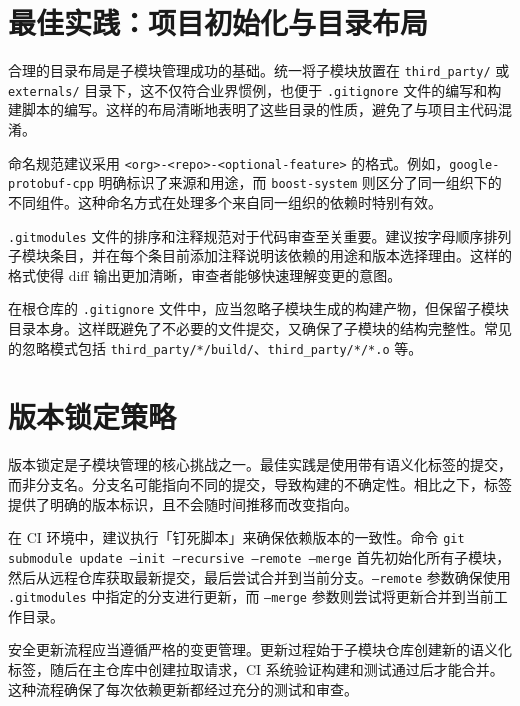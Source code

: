 \chapter{最佳实践：项目初始化与目录布局}
合理的目录布局是子模块管理成功的基础。统一将子模块放置在 \texttt{third\_{}party/} 或 \texttt{externals/} 目录下，这不仅符合业界惯例，也便于 \texttt{.gitignore} 文件的编写和构建脚本的编写。这样的布局清晰地表明了这些目录的性质，避免了与项目主代码混淆。\par
命名规范建议采用 \texttt{<org>-<repo>-<optional-feature>} 的格式。例如，\texttt{google-protobuf-cpp} 明确标识了来源和用途，而 \texttt{boost-system} 则区分了同一组织下的不同组件。这种命名方式在处理多个来自同一组织的依赖时特别有效。\par
\texttt{.gitmodules} 文件的排序和注释规范对于代码审查至关重要。建议按字母顺序排列子模块条目，并在每个条目前添加注释说明该依赖的用途和版本选择理由。这样的格式使得 diff 输出更加清晰，审查者能够快速理解变更的意图。\par
在根仓库的 \texttt{.gitignore} 文件中，应当忽略子模块生成的构建产物，但保留子模块目录本身。这样既避免了不必要的文件提交，又确保了子模块的结构完整性。常见的忽略模式包括 \texttt{third\_{}party/*/build/}、\texttt{third\_{}party/*/*.o} 等。\par
\chapter{版本锁定策略}
版本锁定是子模块管理的核心挑战之一。最佳实践是使用带有语义化标签的提交，而非分支名。分支名可能指向不同的提交，导致构建的不确定性。相比之下，标签提供了明确的版本标识，且不会随时间推移而改变指向。\par
在 CI 环境中，建议执行「钉死脚本」来确保依赖版本的一致性。命令 \texttt{git submodule update --init --recursive --remote --merge} 首先初始化所有子模块，然后从远程仓库获取最新提交，最后尝试合并到当前分支。\texttt{--remote} 参数确保使用 \texttt{.gitmodules} 中指定的分支进行更新，而 \texttt{--merge} 参数则尝试将更新合并到当前工作目录。\par
安全更新流程应当遵循严格的变更管理。更新过程始于子模块仓库创建新的语义化标签，随后在主仓库中创建拉取请求，CI 系统验证构建和测试通过后才能合并。这种流程确保了每次依赖更新都经过充分的测试和审查。\par
